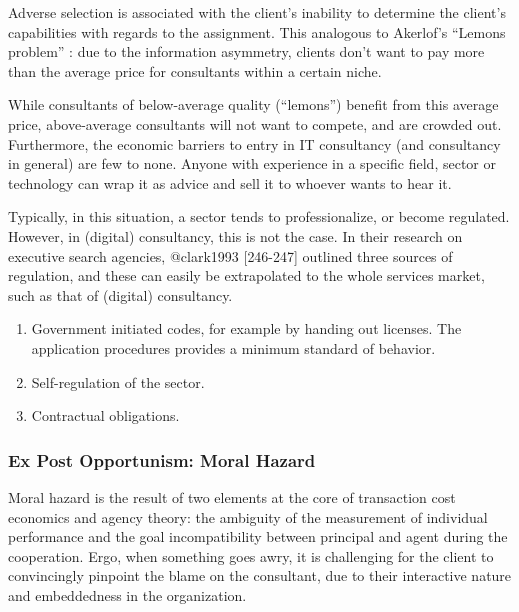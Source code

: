 \documentclass[12pt]{article}
\providecommand{\tightlist}{%
  \setlength{\itemsep}{0pt}\setlength{\parskip}{0pt}}
\begin{document}
Adverse selection is associated with the client's inability to determine
the client's capabilities with regards to the assignment. This analogous
to Akerlof's ``Lemons problem'' \citeyearpar{akerlof1970}: due to the
information asymmetry, clients don't want to pay more than the average
price for consultants within a certain niche.

While consultants of below-average quality (``lemons'') benefit from
this average price, above-average consultants will not want to compete,
and are crowded out. Furthermore, the economic barriers to entry \citep[
463]{fee2004} in IT consultancy (and consultancy in general) are few to
none. Anyone with experience in a specific field, sector or technology
can wrap it as advice and sell it to whoever wants to hear it.

Typically, in this situation, a sector tends to professionalize, or
become regulated. However, in (digital) consultancy, this is not the
case. In their research on executive search agencies, @clark1993
{[}246-247{]} outlined three sources of regulation, and these can easily
be extrapolated to the whole services market, such as that of (digital)
consultancy.

\begin{enumerate}
\def\labelenumi{\arabic{enumi}.}
\tightlist
\item
  Government initiated codes, for example by handing out licenses. The
  application procedures provides a minimum standard of behavior.
\item
  Self-regulation of the sector.
\item
  Contractual obligations.
\end{enumerate}

\subsubsection{Ex Post Opportunism: Moral
Hazard}\label{ex-post-opportunism-moral-hazard}

Moral hazard is the result of two elements at the core of transaction
cost economics and agency theory: the ambiguity of the measurement of
individual performance and the goal incompatibility between principal
and agent during the cooperation. Ergo, when something goes awry, it is
challenging for the client to convincingly pinpoint the blame on the
consultant, due to their interactive nature and embeddedness in the
organization.
\end{document}

